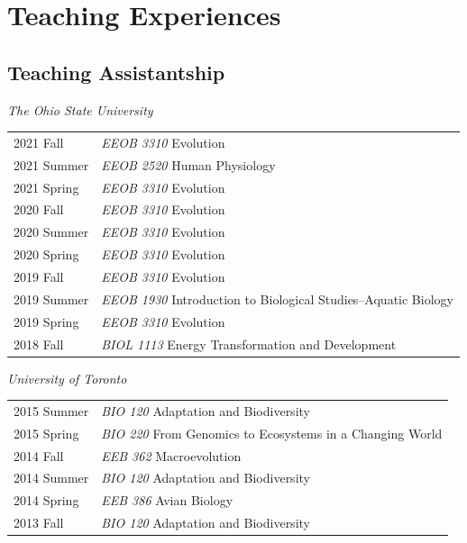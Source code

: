 \documentclass[11pt]{article}
\begin{document}
\hspace{0pt}


\pagebreak

\section*{Teaching Experiences}

\subsection*{Teaching Assistantship}

\textit{The Ohio State University}\\
\begin{longtable}{p{}  p{}}

2021 Fall & \textit{EEOB 3310} Evolution\\
2021 Summer & \textit{EEOB 2520} Human Physiology\\
2021 Spring & \textit{EEOB 3310} Evolution\\
2020 Fall & \textit{EEOB 3310} Evolution\\
2020 Summer & \textit{EEOB 3310} Evolution\\
2020 Spring & \textit{EEOB 3310} Evolution\\
2019 Fall & \textit{EEOB 3310} Evolution\\
2019 Summer & \textit{EEOB 1930} Introduction to Biological Studies--Aquatic Biology\\
2019 Spring & \textit{EEOB 3310} Evolution\\
2018 Fall & \textit{BIOL 1113} Energy Transformation and Development\\
\end{longtable}


\textit{University of Toronto}\\
\begin{longtable}{p{}  p{}}

2015 Summer  & \textit{BIO 120} Adaptation and Biodiversity\\
2015 Spring & \textit{BIO 220} From Genomics to Ecosystems in a Changing World\\
2014 Fall & \textit{EEB 362} Macroevolution\\
2014 Summer & \textit{BIO 120} Adaptation and Biodiversity\\
2014 Spring & \textit{EEB 386} Avian Biology\\
2013 Fall & \textit{BIO 120} Adaptation and Biodiversity\\

\end{longtable}
\end{document}
